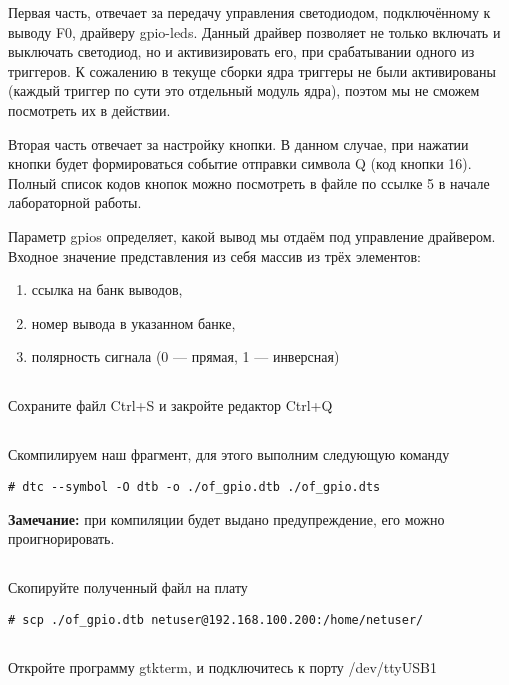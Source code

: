 Первая часть, отвечает за передачу управления светодиодом, подключённому к выводу F0, драйверу gpio-leds. Данный драйвер позволяет не только включать и выключать светодиод, но и активизировать его, при срабатывании одного из триггеров. К сожалению в текуще сборки ядра триггеры не были активированы (каждый триггер по сути это отдельный модуль ядра), поэтом мы не сможем посмотреть их в действии.

Вторая часть отвечает за настройку кнопки. В данном случае, при нажатии кнопки будет формироваться событие отправки символа Q (код кнопки 16). Полный список кодов кнопок можно посмотреть в файле по ссылке 5 в начале лабораторной работы.

Параметр gpios определяет, какой вывод мы отдаём под управление драйвером. Входное значение представления из себя массив из трёх элементов:
\begin{enumerate}
	\item ссылка на банк выводов,
	\item номер вывода в указанном банке,
	\item полярность сигнала (0 — прямая, 1 — инверсная)
\end{enumerate}

\subsection{}Сохраните файл Ctrl+S и закройте редактор Ctrl+Q

\subsection{}Скомпилируем наш фрагмент, для этого выполним следующую команду 
\begin{lstlisting}[style=bash]
# dtc --symbol -O dtb -o ./of_gpio.dtb ./of_gpio.dts
\end{lstlisting}
\textbf{Замечание:} при компиляции будет выдано предупреждение, его можно проигнорировать.

\subsection{}Скопируйте полученный файл на плату
\begin{lstlisting}[style=bash]
# scp ./of_gpio.dtb netuser@192.168.100.200:/home/netuser/
\end{lstlisting}

\subsection{}Откройте программу gtkterm, и подключитесь к порту /dev/ttyUSB1

